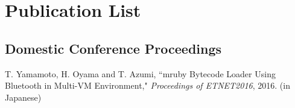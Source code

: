 \documentclass[a4j,12pt,oneside,openany,english]{jsbook}
\begin{document}



\chapter*{Publication List}
\section*{Domestic Conference Proceedings}
\begin{enumerate}[{[}1{]}]
\item
    T. Yamamoto, H. Oyama and T. Azumi,
    ``{mruby Bytecode Loader Using Bluetooth in Multi-VM Environment},"
    \emph{Proceedings of ETNET2016}, 2016.
    (in Japanese)
\end{enumerate}
\end{document}
